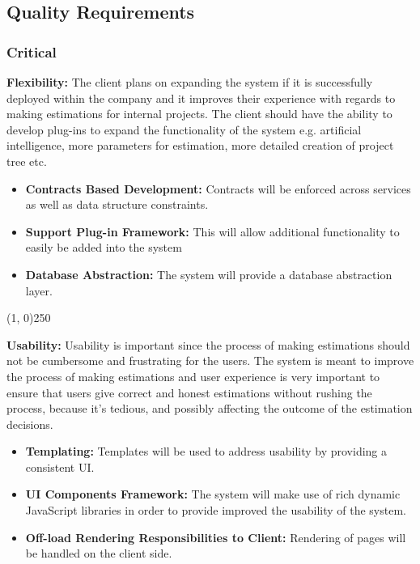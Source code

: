 \subsection{Quality Requirements}
\subsubsection{Critical}
	{\bfseries Flexibility:}
	The client plans on expanding the system if it is successfully deployed within the company and it improves their experience with regards to making estimations for internal projects. The client should have the ability to develop plug-ins to expand the functionality of the system e.g. artificial intelligence, more parameters for estimation, more detailed creation of project tree etc.
		\begin{itemize}
			\item{\bfseries Contracts Based Development:}
				Contracts will be enforced across services as well as data structure constraints.
			\item{\bfseries Support Plug-in Framework:}
				This will allow additional functionality to easily be added into the system
			\item{\bfseries Database Abstraction:}
				The system will provide a database abstraction layer.
		\end{itemize}
		\begin{center}
		\line(1, 0){250}
		\end{center}
	{\bfseries Usability:}
	Usability is important since the process of making estimations should not be cumbersome and frustrating for the users. The system is meant to improve the process of making estimations and user experience is very important to ensure that users give correct and honest estimations without rushing the process, because it's tedious, and possibly affecting the outcome of the estimation decisions.
		\begin{itemize}
			\item{\bfseries Templating:}
				Templates will be used to address usability by providing a consistent UI.
			\item{\bfseries UI Components Framework:}
				The system will make use of rich dynamic JavaScript libraries in order to provide improved the usability of the system.
			\item{\bfseries Off-load Rendering Responsibilities to Client:}
				Rendering of pages will be handled on the client side.
		\end{itemize}
